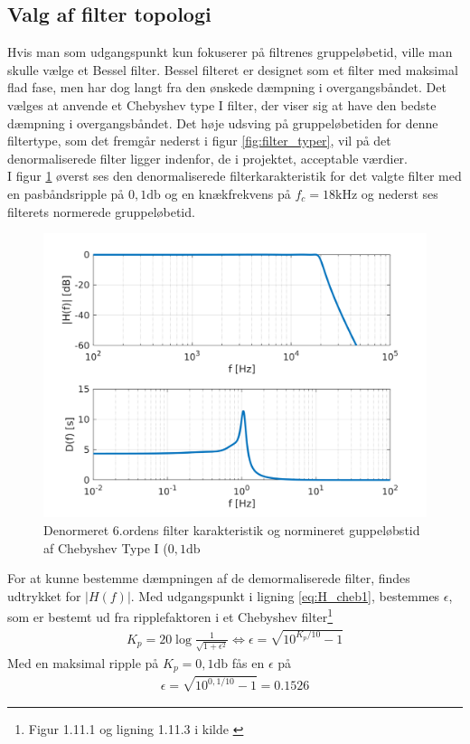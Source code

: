\subsection{Valg af filter topologi}
Hvis man som udgangspunkt kun fokuserer på filtrenes gruppeløbetid, ville man skulle vælge et Bessel filter. 
Bessel filteret er designet som et filter med maksimal flad fase, men har dog langt fra den ønskede dæmpning i overgangsbåndet.
Det vælges at anvende et Chebyshev type I filter, der viser sig at have den bedste dæmpning i overgangsbåndet.
Det høje udsving på gruppeløbetiden for denne filtertype, som det fremgår nederst i figur \ref{fig:filter_typer}, vil på det denormaliserede filter ligger indenfor, de i projektet, acceptable værdier. 
\\
I figur \ref{fig:filter_cheb1_denorm} øverst ses den denormaliserede filterkarakteristik for det valgte filter med en pasbåndsripple på $0,1 \si{\decibel}$ og en knækfrekvens på $f_c = 18 \si{\kilo\hertz}$ og nederst ses filterets normerede gruppeløbetid. 

\begin{figure}[h!]
	\centering
	\includegraphics[width=1\textwidth]{matlab/filter_cheb1_denorm.png}
	\caption{Denormeret 6.ordens filter karakteristik og normineret guppeløbstid af Chebyshev Type I ($0,1 \si{\decibel}$}
	\label{fig:filter_cheb1_denorm}
\end{figure}

For at kunne bestemme dæmpningen af de demormaliserede filter, findes udtrykket for $|H(f)|$.
Med udgangspunkt i ligning \ref{eq:H_cheb1}, bestemmes $\epsilon$, som er bestemt ud fra ripplefaktoren i et Chebyshev filter\footnote{Figur 1.11.1 og ligning 1.11.3 i kilde \cite{anfilter}}
\begin{align}
	K_p = 20 \log \frac{1}{\sqrt{1+\epsilon^2}} \Leftrightarrow \epsilon = \sqrt{10^{K_p/10}-1}
\end{align}
Med en maksimal ripple på $K_p = 0,1 \si{\decibel}$ fås en $\epsilon$ på 
\begin{align}
	\epsilon = \sqrt{10^{0,1/10}-1} = \num{0.1526}
\end{align}

